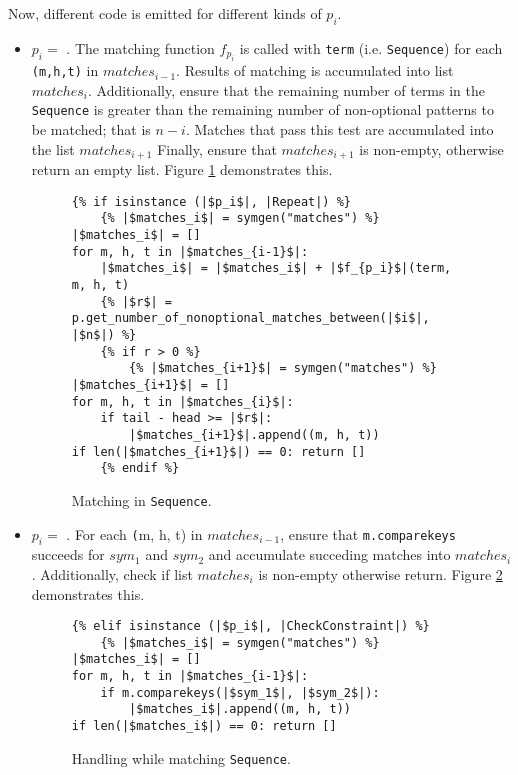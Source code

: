Now, different code is emitted for different kinds of $p_i$.

\begin{itemize}
\item $p_i=$ \PatternRepeat. The matching function $f_{p_i}$ is called with \texttt{term} (i.e. \texttt{Sequence}) for each \texttt{(m,h,t)} in $matches_{i-1}$. Results of matching is accumulated into list $matches_{i}$. Additionally, ensure that the remaining number of terms in the \texttt{Sequence} is greater than the remaining number of non-optional patterns to be matched; that is $n-i$. Matches that pass this test are accumulated into the list $matches_{i+1}$ Finally, ensure that $matches_{i+1}$ is non-empty, otherwise return an empty list. Figure \ref{codegen-pattern-seq-2} demonstrates this.

\begin{figure}[htb]
\centering
\begin{verbatim}
{% if isinstance (|$p_i$|, |Repeat|) %}
	{% |$matches_i$| = symgen("matches") %}
|$matches_i$| = []
for m, h, t in |$matches_{i-1}$|:
	|$matches_i$| = |$matches_i$| + |$f_{p_i}$|(term, m, h, t)
	{% |$r$| = p.get_number_of_nonoptional_matches_between(|$i$|, |$n$|) %}
	{% if r > 0 %}
		{% |$matches_{i+1}$| = symgen("matches") %}
|$matches_{i+1}$| = []
for m, h, t in |$matches_{i}$|:
	if tail - head >= |$r$|:
		|$matches_{i+1}$|.append((m, h, t))
if len(|$matches_{i+1}$|) == 0: return []
	{% endif %}
\end{verbatim}
\caption{Matching \RepeatNoArg \space in \texttt{Sequence}.}
\label{codegen-pattern-seq-2}
\end{figure}

\item $p_i=$ \PatternCheckConstraint. For each \texttt(m, h, t) in $matches_{i-1}$, ensure that \texttt{m.comparekeys} succeeds for $sym_1$ and $sym_2$ and accumulate succeding matches into $matches_{i}$. Additionally, check if list $matches_{i}$ is non-empty otherwise return. Figure \ref{codegen-pattern-seq-3} demonstrates this.


\begin{figure}[htb]
\centering
\begin{verbatim}
{% elif isinstance (|$p_i$|, |CheckConstraint|) %}
	{% |$matches_i$| = symgen("matches") %}
|$matches_i$| = []
for m, h, t in |$matches_{i-1}$|:
	if m.comparekeys(|$sym_1$|, |$sym_2$|):
		|$matches_i$|.append((m, h, t))
if len(|$matches_i$|) == 0: return []
\end{verbatim}
\caption{Handling \ConstraintCheckNoArg \space while matching \texttt{Sequence}.}
\label{codegen-pattern-seq-3}
\end{figure}


\end{itemize}

